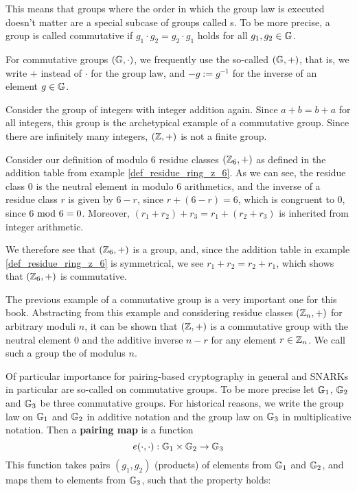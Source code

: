 This means that groups where the order in which the group law is executed doesn't matter are a special subcase of groups called s. To be more precise, a group is called commutative if  $g_1\cdot g_2 = g_2 \cdot g_1$ holds for all $g_1,g_2\in\mathbb{G}$.
\begin{notation}
For commutative groups $(\mathbb{G},\cdot)$, we frequently use the so-called  $(\mathbb{G},+)$, that is, we write $+$ instead of $\cdot$ for the group law, and $-g:=g^{-1}$ for the inverse of an element $g\in\mathbb{G}$.
\end{notation}
\begin{example} Consider the group of integers with integer addition again.
Since $a+b=b+a$ for all integers, this group is the archetypical example of a commutative group. Since there are infinitely many integers, $(\mathbb{Z},+)$ is not a finite group.
\end{example}
\begin{example} Consider our definition of modulo $6$ residue classes $(\mathbb{Z}_6,+)$ as defined in the addition table from example \ref{def_residue_ring_z_6}. As we can see, the residue class $0$ is the neutral element in modulo $6$ arithmetics, and the inverse of a residue class $r$ is given by $6-r$, since $r+(6-r)=6$, which is congruent to $0$, since $6 \text{ mod } 6=0$. Moreover, $(r_1+r_2)+r_3=r_1+(r_2+r_3)$ is inherited from integer arithmetic.

We therefore see that $(\mathbb{Z}_6,+)$ is a group, and, since the addition table in example \ref{def_residue_ring_z_6} is symmetrical, we see $r_1+r_2 = r_2+r_1$, which shows that $(\mathbb{Z}_6,+)$ is commutative.
\end{example}
The previous example of a commutative group is a very important one for this book. Abstracting from this example and considering residue classes $(\mathbb{Z}_n,+)$ for arbitrary moduli $n$, it can be shown that $(\mathbb{Z},+)$ is a commutative group with the neutral element $0$ and the additive inverse $n-r$ for any element $r\in\mathbb{Z}_n$. We call such a group the  of modulus $n$.

Of particular importance for pairing-based cryptography in general and SNARKs in particular are so-called  on commutative groups. To be more precise let $\mathbb{G}_1$, $\mathbb{G}_2$ and $\mathbb{G}_3$ be three commutative groups. For historical reasons, we write the group law on $\mathbb{G}_1$ and $\mathbb{G}_2$ in additive notation and the group law on $\mathbb{G}_3$ in multiplicative notation. Then a \textbf{pairing map} is a function
\begin{equation}\label{pairing-map}
e(\cdot,\cdot): \mathbb{G}_1 \times \mathbb{G}_2 \to \mathbb{G}_3
\end{equation}
This function takes pairs $(g_1,g_2)$ (products) of elements from $\mathbb{G}_1$ and $\mathbb{G}_2$, and maps them to elements from $\mathbb{G}_3$, such that the  property holds:

